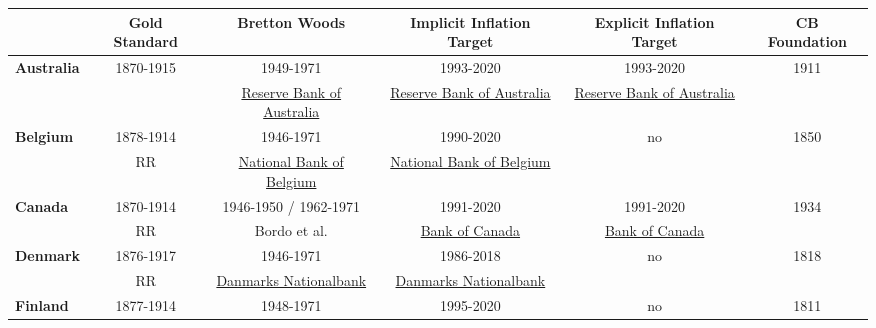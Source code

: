 \begin{landscape}
\begin{table}[]
\caption{Allocation of countries to historical periods} 
\label{T_HistoricalPeriodsSource1}
\centering 
\scriptsize
\def\sym#1{\ifmmode^{#1}\else\(^{#1}\)\fi} 
\begin{longtable}{l*{1}{cccc|c}}
\hline\hline
                    &\multicolumn{1}{c}{\textbf{Gold Standard}}&\multicolumn{1}{c}{\textbf{Bretton Woods}}&\multicolumn{1}{c}{\textbf{Implicit Inflation Target}}&\multicolumn{1}{c}{\textbf{Explicit Inflation Target}}&\multicolumn{1}{c}{\textbf{CB Foundation}}\\
\hline
\textbf{Australia} & 1870-1915 & 1949-1971 & 1993-2020 & 1993-2020 & 1911 \\
           & \cite{Reinhart2009} &\href{https://www.rba.gov.au/speeches/1997/sp-gov-290997.html}{Reserve Bank of Australia} & \href{https://www.rba.gov.au/speeches/1997/sp-gov-290997.html}{Reserve Bank of Australia} & \href{https://www.rba.gov.au/speeches/1997/sp-gov-290997.html}{Reserve Bank of Australia} \\
[1ex]
\textbf{Belgium}  & 1878-1914   & 1946-1971 & 1990-2020 & no & 1850 \\
         & RR \citeyear{Reinhart2009}   & \href{https://www.nbb.be/en/notes-and-coins/belgian-currency/history-belgian-franc/1945-2002-rise-and-disappearance-belgian}{National Bank of Belgium} & \href{https://www.nbb.be/en/notes-and-coins/belgian-currency/history-belgian-franc/1945-2002-rise-and-disappearance-belgian}{National Bank of Belgium} & \\
[1ex]
\textbf{Canada}   & 1870-1914 & 1946-1950 / 1962-1971 & 1991-2020 & 1991-2020 & 1934\\
         & RR \citeyear{Reinhart2009}   & Bordo et al. \citeyear{Bordo2010} & \href{https://www.bankofcanada.ca/wp-content/uploads/2011/12/bocreview-mar1991.pdf}{Bank of Canada} & \href{https://www.bankofcanada.ca/wp-content/uploads/2011/12/bocreview-mar1991.pdf}{Bank of Canada} & \\
[1ex]
\textbf{Denmark}    & 1876-1917 & 1946-1971 & 1986-2018  & no & 1818 \\
    & RR \citeyear{Reinhart2009} & \href{http://www.nationalbanken.dk/EditorImages/Artikel\%20billeder/Danmark\%20Nationalbank\%20200aar_stor_uk.jpg}{Danmarks Nationalbank} & \href{http://www.nationalbanken.dk/EditorImages/Artikel\%20billeder/Danmark\%20Nationalbank\%20200aar_stor_uk.jpg}{Danmarks Nationalbank} & & \\
[1ex]
\textbf{Finland}  & 1877-1914  & 1948-1971  & 1995-2020 & no & 1811 \\

\end{longtable}
\end{table}
\end{landscape}
